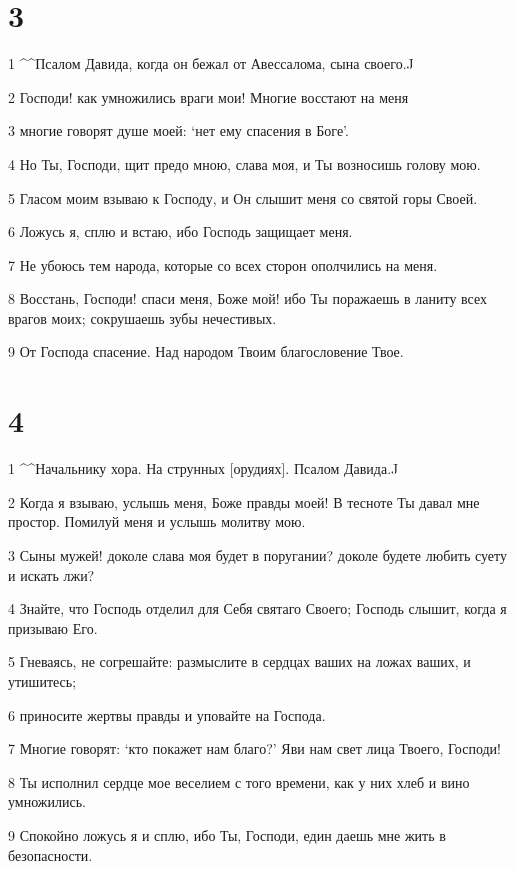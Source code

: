 \chapter{3}

\par 1 ^^Псалом Давида, когда он бежал от Авессалома, сына своего.^^
\par 2 Господи! как умножились враги мои! Многие восстают на меня
\par 3 многие говорят душе моей: `нет ему спасения в Боге'.
\par 4 Но Ты, Господи, щит предо мною, слава моя, и Ты возносишь голову мою.
\par 5 Гласом моим взываю к Господу, и Он слышит меня со святой горы Своей.
\par 6 Ложусь я, сплю и встаю, ибо Господь защищает меня.
\par 7 Не убоюсь тем народа, которые со всех сторон ополчились на меня.
\par 8 Восстань, Господи! спаси меня, Боже мой! ибо Ты поражаешь в ланиту всех врагов моих; сокрушаешь зубы нечестивых.
\par 9 От Господа спасение. Над народом Твоим благословение Твое.

\chapter{4}

\par 1 ^^Начальнику хора. На струнных [орудиях]. Псалом Давида.^^
\par 2 Когда я взываю, услышь меня, Боже правды моей! В тесноте Ты давал мне простор. Помилуй меня и услышь молитву мою.
\par 3 Сыны мужей! доколе слава моя будет в поругании? доколе будете любить суету и искать лжи?
\par 4 Знайте, что Господь отделил для Себя святаго Своего; Господь слышит, когда я призываю Его.
\par 5 Гневаясь, не согрешайте: размыслите в сердцах ваших на ложах ваших, и утишитесь;
\par 6 приносите жертвы правды и уповайте на Господа.
\par 7 Многие говорят: `кто покажет нам благо?' Яви нам свет лица Твоего, Господи!
\par 8 Ты исполнил сердце мое веселием с того времени, как у них хлеб и вино умножились.
\par 9 Спокойно ложусь я и сплю, ибо Ты, Господи, един даешь мне жить в безопасности.

